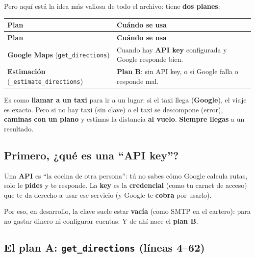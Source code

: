 \documentclass[11pt,a4paper]{article}
\begin{document}
Pero aquí está la idea más valiosa de todo el archivo: tiene \textbf{dos planes}:

\begin{center}
{\small
\setlength{\tabcolsep}{4pt}
\begin{longtable}{@{}>{\raggedright\arraybackslash}p{4.6cm}>{\raggedright\arraybackslash}p{10.2cm}@{}}
\toprule
\textbf{Plan} & \textbf{Cuándo se usa} \\
\midrule
\endfirsthead
\toprule
\textbf{Plan} & \textbf{Cuándo se usa} \\
\midrule
\endhead
\textbf{Google Maps} (\texttt{get\_directions}) & Cuando hay \textbf{API key} configurada y
Google responde bien. \\
\textbf{Estimación} (\texttt{\_estimate\_directions}) & \textbf{Plan B}: sin API key, o si
Google falla o responde mal. \\
\bottomrule
\end{longtable}
}
\end{center}

\begin{analogia}
Es como \textbf{llamar a un taxi} para ir a un lugar: si el taxi llega (\textbf{Google}), el
viaje es exacto. Pero si no hay taxi (sin clave) o el taxi se descompone (error), \textbf{caminas
con un plano} y estimas la distancia \textbf{al vuelo}. \textbf{Siempre llegas} a un resultado.
\end{analogia}

\subsection{Primero, ¿qué es una ``API key''?}

Una \textbf{API} es ``la cocina de otra persona'': tú no sabes cómo Google calcula rutas, solo
le \textbf{pides} y te responde. La \textbf{key} es la \textbf{credencial} (como tu carnet de
acceso) que te da derecho a usar ese servicio (y Google te \textbf{cobra} por usarlo).

Por eso, en desarrollo, la clave suele estar \textbf{vacía} (como SMTP en el cartero): para no
gastar dinero ni configurar cuentas. Y de ahí nace el \textbf{plan B}.

\subsection{El plan A: \texttt{get\_directions} (líneas 4--62)}
\end{document}
